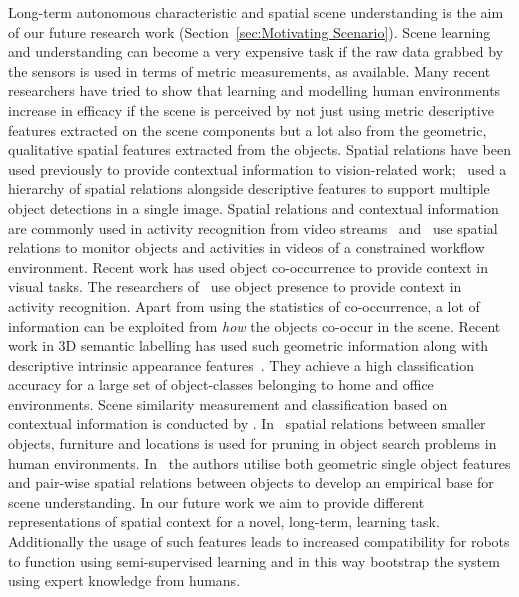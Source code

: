 \documentclass[letterpaper, 10 pt, conference]{ieeeconf}  %
\begin{document}
Long-term autonomous characteristic and spatial scene understanding is the aim of our future research work (Section~\ref{sec:Motivating Scenario}). Scene learning and understanding can become a very expensive task if the raw data grabbed by the sensors is used in terms of metric measurements, as available. Many recent researchers have tried to show that learning and modelling human environments increase in efficacy if the scene is perceived by not just using metric descriptive features extracted on the scene components but a lot also from the geometric, qualitative spatial features extracted from the objects. Spatial relations have been used previously to provide contextual information to vision-related work;~\cite{MyungJin:CVPR2010} used a hierarchy of spatial relations alongside descriptive features to support multiple object detections in a single image. Spatial relations and contextual information are commonly used in activity recognition from video streams~\cite{Krishna:ECAI2010} and~\cite{Behera2012} use spatial relations to monitor objects and activities in videos of a constrained workflow environment. Recent work has used object co-occurrence to provide context in visual tasks. The researchers of~\cite{Li:2012} use object presence to provide context in activity recognition. Apart from using the statistics of co-occurrence, a lot of information can be exploited from \textit{how} the objects co-occur in the scene. Recent work in 3D semantic labelling has used such geometric information along with descriptive intrinsic appearance features~\cite{Koppula:NIPS2011}. They achieve a high classification accuracy for a large set of object-classes belonging to home and office environments. Scene similarity measurement and classification based on contextual information is conducted by \cite{Fisher:ACMT2011}. In~\cite{Aydemir:ICRA2011} spatial relations between smaller objects, furniture and locations is used for pruning in object search problems in human environments. In~\cite{Southey:2007,kasper:2011} the authors utilise both geometric single object features and pair-wise spatial relations between objects to develop an empirical base for scene understanding. In our future work we aim to provide different representations of spatial context for a novel, long-term, learning task. Additionally the usage of such features leads to increased compatibility for robots to function using semi-supervised learning and in this way bootstrap the system using expert knowledge from humans.
\end{document}
